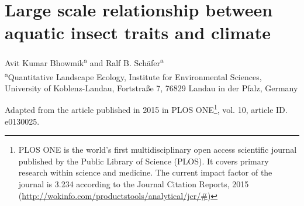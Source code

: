 \chapter{Large scale relationship between aquatic insect traits and climate}
\label{chapter4}

Avit Kumar Bhowmik\textsuperscript{a} and Ralf B. Schäfer\textsuperscript{a}\\[.5cm]
\small
\textsuperscript{a}Quantitative Landscape Ecology, Institute for Environmental Sciences, University of Koblenz-Landau, Fortstraße 7, 76829 Landau in der Pfalz, Germany\\[1cm]

\medskip

\normalsize
\noindent Adapted from the article published in 2015 in PLOS ONE\footnote{PLOS ONE is the world's first multidisciplinary open access scientific journal published by the Public Library of Science (PLOS). It covers primary research within science and medicine. The current impact factor of the journal is 3.234 according to the Journal Citation Reports, 2015 (\href{http://wokinfo.com/products_tools/analytical/jcr/#}{http://wokinfo.com/products\textunderscore tools/analytical/jcr/#})}, vol. 10, article ID. e0130025.\\[.5cm]

